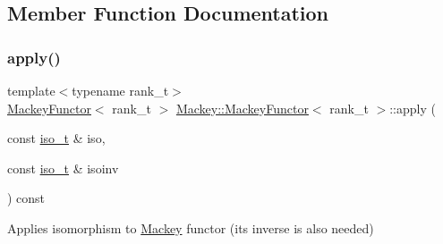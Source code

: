 \subsection{Member Function Documentation}
\mbox{\label{classMackey_1_1MackeyFunctor_a24b7b8ce61be39ea51432d0d3737a55f}} 
\subsubsection{\texorpdfstring{apply()}{apply()}}
{\footnotesize\ttfamily template$<$typename rank\+\_\+t$>$ \\
\hyperlink{classMackey_1_1MackeyFunctor}{Mackey\+Functor}$<$ rank\+\_\+t $>$ \hyperlink{classMackey_1_1MackeyFunctor}{Mackey\+::\+Mackey\+Functor}$<$ rank\+\_\+t $>$\+::apply (\begin{DoxyParamCaption}\item[{const \hyperlink{classMackey_1_1MackeyFunctor_a53637e79f2502411ba085d2b2a61bb67}{iso\+\_\+t} \&}]{iso,  }\item[{const \hyperlink{classMackey_1_1MackeyFunctor_a53637e79f2502411ba085d2b2a61bb67}{iso\+\_\+t} \&}]{isoinv }\end{DoxyParamCaption}) const}



Applies isomorphism to \hyperlink{namespaceMackey}{Mackey} functor (its inverse is also needed) 

